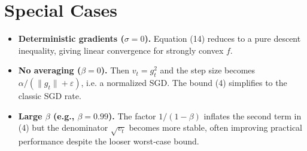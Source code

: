 \documentclass{article}
\begin{document}
\section*{Special Cases}
\begin{itemize}
\item \textbf{Deterministic gradients ($\sigma=0$).}  
Equation (14) reduces to a pure descent inequality, giving linear convergence for strongly convex $f$.
\item \textbf{No averaging ($\beta=0$).}  
Then $v_{t}=g_{t}^{2}$ and the step size becomes $\alpha/(\|g_{t}\|+\varepsilon)$, i.e. a normalized SGD. The bound (4) simplifies to the classic SGD rate.
\item \textbf{Large $\beta$ (e.g., $\beta=0.99$).}  
The factor $1/(1-\beta)$ inflates the second term in (4) but the denominator $\sqrt{v_{t}}$ becomes more stable, often improving practical performance despite the looser worst‑case bound.
\end{itemize}
\end{document}

